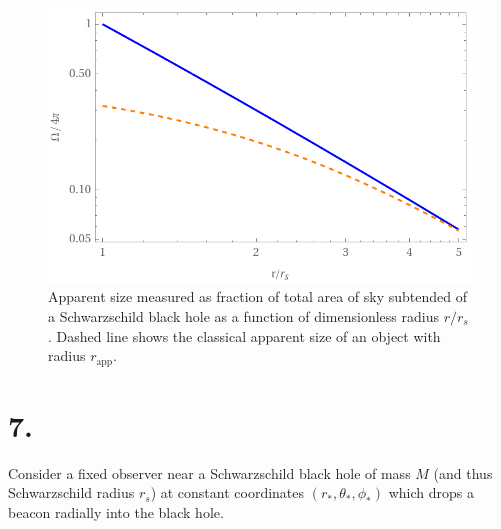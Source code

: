 \documentclass[12pt]{article}
\begin{document}
\begin{figure}
\begin{center}
\includegraphics[scale=1]{Apparent_Size}
\end{center}
\caption{Apparent size measured as fraction of total area of sky subtended of a Schwarzschild black hole as a function of dimensionless radius $r / r_s$. Dashed line shows the classical apparent size of an object with radius $r_{\text{app}}$. }
\end{figure}


\section*{7.}

Consider a fixed observer near a Schwarzschild black hole of mass $M$ (and thus Schwarzschild radius $r_s$) at constant coordinates $(r_*, \theta_*, \phi_*)$ which drops a beacon radially into the black hole. 
\end{document}
